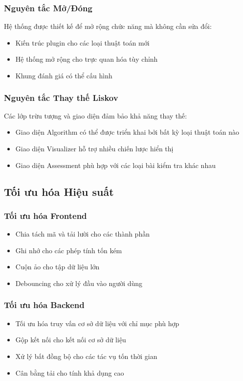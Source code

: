 \subsubsection{Nguyên tắc Mở/Đóng}
Hệ thống được thiết kế để mở rộng chức năng mà không cần sửa đổi:
\begin{itemize}
    \item Kiến trúc plugin cho các loại thuật toán mới
    \item Hệ thống mở rộng cho trực quan hóa tùy chỉnh
    \item Khung đánh giá có thể cấu hình
\end{itemize}

\subsubsection{Nguyên tắc Thay thế Liskov}
Các lớp trừu tượng và giao diện đảm bảo khả năng thay thế:
\begin{itemize}
    \item Giao diện Algorithm có thể được triển khai bởi bất kỳ loại thuật toán nào
    \item Giao diện Visualizer hỗ trợ nhiều chiến lược hiển thị
    \item Giao diện Assessment phù hợp với các loại bài kiểm tra khác nhau
\end{itemize}

\subsection{Tối ưu hóa Hiệu suất}

\subsubsection{Tối ưu hóa Frontend}
\begin{itemize}
    \item Chia tách mã và tải lười cho các thành phần
    \item Ghi nhớ cho các phép tính tốn kém
    \item Cuộn ảo cho tập dữ liệu lớn
    \item Debouncing cho xử lý đầu vào người dùng
\end{itemize}

\subsubsection{Tối ưu hóa Backend}
\begin{itemize}
    \item Tối ưu hóa truy vấn cơ sở dữ liệu với chỉ mục phù hợp
    \item Gộp kết nối cho kết nối cơ sở dữ liệu
    \item Xử lý bất đồng bộ cho các tác vụ tốn thời gian
    \item Cân bằng tải cho tính khả dụng cao
\end{itemize}

